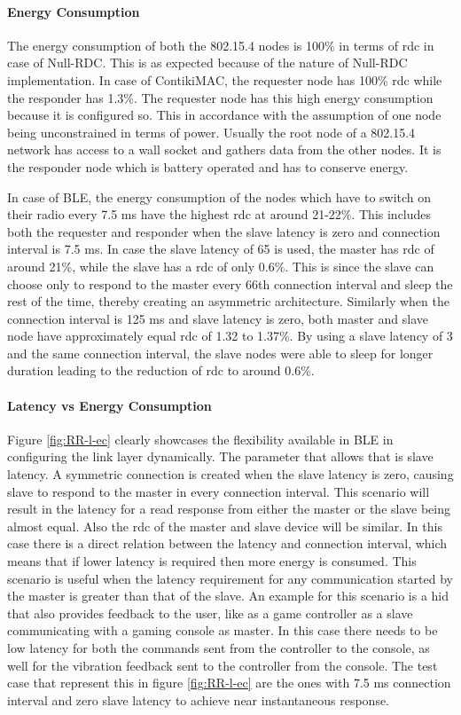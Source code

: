 \paragraph{Energy Consumption}
The energy consumption of both the 802.15.4 nodes is 100\% in terms of \gls{rdc} in case of Null-RDC. This is as expected because of the nature of Null-RDC implementation. In case of ContikiMAC, the requester node has 100\% \gls{rdc} while the responder has 1.3\%. The requester node has this high energy consumption because it is configured so. This in accordance with the assumption of one node being unconstrained in terms of power. Usually the root node of a 802.15.4 network has access to a wall socket and gathers data from the other nodes. It is the responder node which is battery operated and has to conserve energy. 

In case of BLE, the energy consumption of the nodes which have to switch on their radio every 7.5 ms have the highest \gls{rdc} at around 21-22\%. This includes both the requester and responder when the slave latency is zero and connection interval is 7.5 ms. In case the slave latency of 65 is used, the master has \gls{rdc} of around 21\%, while the slave has a \gls{rdc} of only 0.6\%. This is since the slave  can choose only to respond to the master every 66th connection interval and sleep the rest of the time, thereby creating an asymmetric architecture. Similarly when the connection interval is 125 ms and slave latency is zero, both master and slave node have 
approximately equal \gls{rdc} of 1.32 to 1.37\%. By using a slave latency of 3 and the same connection interval, the slave nodes were able to sleep for longer duration leading to the reduction of \gls{rdc} to around 0.6\%.

\paragraph{Latency vs Energy Consumption}

Figure \ref{fig:RR-l-ec} clearly showcases the flexibility available in BLE in configuring the link layer dynamically. The parameter that allows that is slave latency. A symmetric connection is created when the slave latency is zero, causing slave to respond to the master in every connection interval. This scenario will result in the latency for a read response from either the master or the slave being almost equal. Also the \gls{rdc} of the master and slave device will be similar. In this case there is a direct relation between the latency and connection interval, which means that if lower latency is required then more energy is consumed. This scenario is useful when the latency requirement for any communication started by the master is greater than that of the slave. An example for this scenario is a \gls{hid} that also provides feedback to the user, like as a game controller as a slave communicating with a gaming console as master. In this case there needs to be low latency for both the commands sent from the controller to the console, as well for the vibration feedback sent to the controller from the console. The test case that represent this in figure \ref{fig:RR-l-ec} are the ones with 7.5 ms connection interval and zero slave latency to achieve near instantaneous response.

